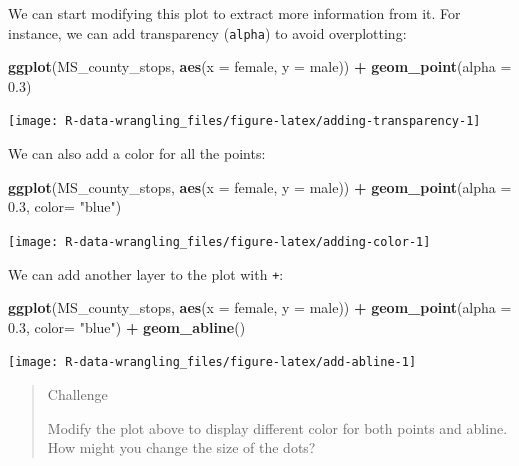 \documentclass[]{book}
\newenvironment{Shaded}{\begin{snugshade}}{\end{snugshade}}
\newcommand{\DataTypeTok}[1]{\textcolor[rgb]{0.13,0.29,0.53}{#1}}
\newcommand{\FloatTok}[1]{\textcolor[rgb]{0.00,0.00,0.81}{#1}}
\newcommand{\KeywordTok}[1]{\textcolor[rgb]{0.13,0.29,0.53}{\textbf{#1}}}
\newcommand{\NormalTok}[1]{#1}
\newcommand{\OperatorTok}[1]{\textcolor[rgb]{0.81,0.36,0.00}{\textbf{#1}}}
\newcommand{\StringTok}[1]{\textcolor[rgb]{0.31,0.60,0.02}{#1}}
\begin{document}
We can start modifying this plot to extract more information from it. For instance, we can add transparency (\texttt{alpha}) to avoid overplotting:

\begin{Shaded}
\begin{Highlighting}[]
  \KeywordTok{ggplot}\NormalTok{(MS_county_stops, }\KeywordTok{aes}\NormalTok{(}\DataTypeTok{x =}\NormalTok{ female, }\DataTypeTok{y =}\NormalTok{ male)) }\OperatorTok{+}\StringTok{ }
\StringTok{  }\KeywordTok{geom_point}\NormalTok{(}\DataTypeTok{alpha =} \FloatTok{0.3}\NormalTok{)}
\end{Highlighting}
\end{Shaded}

\texttt{[image: R-data-wrangling\_files/figure-latex/adding-transparency-1]}

We can also add a color for all the points:

\begin{Shaded}
\begin{Highlighting}[]
\KeywordTok{ggplot}\NormalTok{(MS_county_stops, }\KeywordTok{aes}\NormalTok{(}\DataTypeTok{x =}\NormalTok{ female, }\DataTypeTok{y =}\NormalTok{ male)) }\OperatorTok{+}\StringTok{ }
\StringTok{  }\KeywordTok{geom_point}\NormalTok{(}\DataTypeTok{alpha =} \FloatTok{0.3}\NormalTok{, }\DataTypeTok{color=} \StringTok{"blue"}\NormalTok{)}
\end{Highlighting}
\end{Shaded}

\texttt{[image: R-data-wrangling\_files/figure-latex/adding-color-1]}

We can add another layer to the plot with \texttt{+}:

\begin{Shaded}
\begin{Highlighting}[]
\KeywordTok{ggplot}\NormalTok{(MS_county_stops, }\KeywordTok{aes}\NormalTok{(}\DataTypeTok{x =}\NormalTok{ female, }\DataTypeTok{y =}\NormalTok{ male)) }\OperatorTok{+}\StringTok{ }
\StringTok{  }\KeywordTok{geom_point}\NormalTok{(}\DataTypeTok{alpha =} \FloatTok{0.3}\NormalTok{, }\DataTypeTok{color=} \StringTok{"blue"}\NormalTok{) }\OperatorTok{+}
\StringTok{  }\KeywordTok{geom_abline}\NormalTok{()}
\end{Highlighting}
\end{Shaded}

\texttt{[image: R-data-wrangling\_files/figure-latex/add-abline-1]}

\begin{quote}
Challenge

Modify the plot above to display different color for both points and abline. How might you change the size of the dots?
\end{quote}
\end{document}
